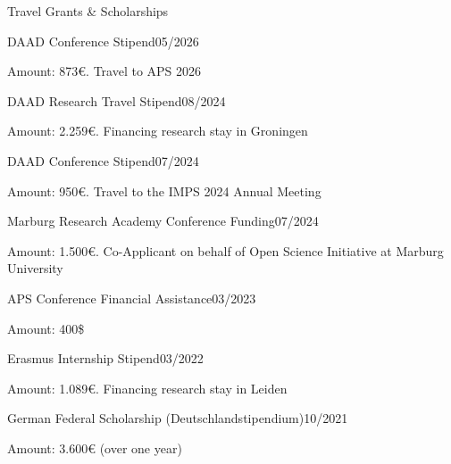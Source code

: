 \documentclass{resume} %
\begin{document}
\begin{rSection}{Travel Grants \& Scholarships}

\begin{rSubsection}{DAAD Conference Stipend}{05/2026}{}
\item Amount: 873€. Travel to APS 2026
\end{rSubsection}

\begin{rSubsection}{DAAD Research Travel Stipend}{08/2024}{}
\item Amount: 2.259€. Financing research stay in Groningen
\end{rSubsection}

\begin{rSubsection}{DAAD Conference Stipend}{07/2024}{}
\item Amount: 950€. Travel to the IMPS 2024 Annual Meeting
\end{rSubsection}

\begin{rSubsection}{Marburg Research Academy Conference Funding}{07/2024}{}
\item Amount: 1.500€.  Co-Applicant on behalf of Open Science Initiative at Marburg University
\end{rSubsection}

\begin{rSubsection}{APS Conference Financial Assistance}{03/2023}{}
\item Amount: 400\$
\end{rSubsection}

\begin{rSubsection}{Erasmus Internship Stipend}{03/2022}{}
\item Amount: 1.089€. Financing research stay in Leiden
\end{rSubsection}

\begin{rSubsection}{German Federal Scholarship (Deutschlandstipendium)}{10/2021}{}
\item Amount: 3.600€ (over one year)
\end{rSubsection}

\end{rSection}
\end{document}
